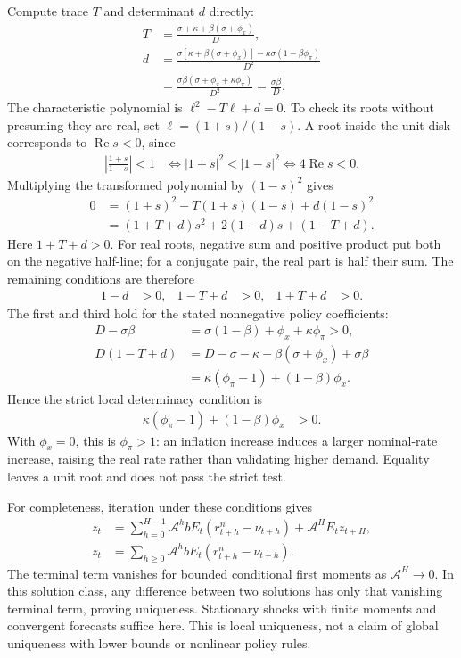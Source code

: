 Compute trace $T$ and determinant $d$ directly:
\begin{align}
 T&=\frac{\sigma+\kappa+\beta(\sigma+\phi_x)}D,\\
 d&=\frac{\sigma[\kappa+\beta(\sigma+\phi_x)]
                   -\kappa\sigma(1-\beta\phi_\pi)}{D^2}\\
  &=\frac{\sigma\beta(\sigma+\phi_x+\kappa\phi_\pi)}{D^2}
   =\frac{\sigma\beta}{D}.
\end{align}
The characteristic polynomial is $\ell^2-T\ell+d=0$. To check its roots without
presuming they are real, set $\ell=(1+s)/(1-s)$. A root inside the unit disk
corresponds to $\operatorname{Re}s<0$, since
\begin{align}
 \left|\frac{1+s}{1-s}\right|<1
 &\iff |1+s|^2<|1-s|^2\iff 4\operatorname{Re}s<0.
\end{align}
Multiplying the transformed polynomial by $(1-s)^2$ gives
\begin{align}
 0&=(1+s)^2-T(1+s)(1-s)+d(1-s)^2\\
  &=(1+T+d)s^2+2(1-d)s+(1-T+d).
\end{align}
Here $1+T+d>0$. For real roots, negative sum and positive product put both
on the negative half-line; for a conjugate pair, the real part is half their
sum. The remaining conditions are therefore
\begin{align}
 1-d&>0,&1-T+d&>0,&1+T+d&>0.
\end{align}
The first and third hold for the stated nonnegative policy coefficients:
\begin{align}
 D-\sigma\beta&=\sigma(1-\beta)+\phi_x+\kappa\phi_\pi>0,\\
 D(1-T+d)
 &=D-\sigma-\kappa-\beta(\sigma+\phi_x)+\sigma\beta\\
 &=\kappa(\phi_\pi-1)+(1-\beta)\phi_x.
\end{align}
Hence the strict local determinacy condition is
\begin{align}
 \kappa(\phi_\pi-1)+(1-\beta)\phi_x&>0.
 \label{eq:nk-determinacy}
\end{align}
With $\phi_x=0$, this is $\phi_\pi>1$: an inflation increase induces a larger
nominal-rate increase, raising the real rate rather than validating higher
demand. Equality leaves a unit root and does not pass the strict test.

For completeness, iteration under these conditions gives
\begin{align}
 z_t&=\sum_{h=0}^{H-1}\mathcal A^h b
                 E_t(r_{t+h}^n-\nu_{t+h})+\mathcal A^HE_tz_{t+H},\\
 z_t&=\sum_{h\geq0}\mathcal A^h bE_t(r_{t+h}^n-\nu_{t+h}).
\end{align}
The terminal term vanishes for bounded conditional first moments as
$\mathcal A^H\to0$. In this solution class, any difference between two solutions
has only that vanishing terminal term, proving uniqueness. Stationary shocks
with finite moments and convergent forecasts suffice here. This is local
uniqueness, not a claim of global uniqueness with lower bounds or nonlinear
policy rules.


